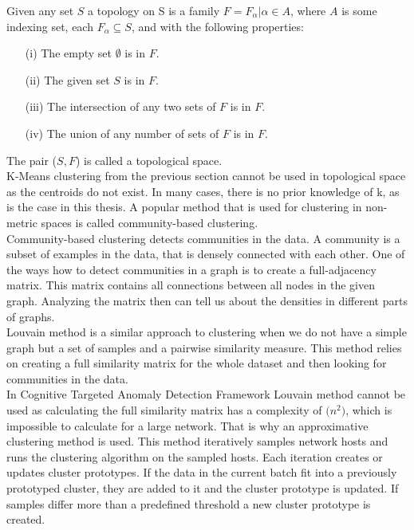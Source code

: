 \documentclass[thesis=B,english]{FITthesis}[2012/10/20]
\begin{document}
Given any set $S$ a topology on S is a family $F ={F_{\alpha} | \alpha \in A}$, where $A$ is some indexing set, each $F_{\alpha}  \subseteq S$, and with the following properties:
\begin{enumerate}                                                                 
    \item [(i)] The empty set $\emptyset$ is in $F$.                                                 
    \item [(ii)] The given set $S$ is in $F$.                                       
    \item [(iii)] The intersection of any two sets of $F$ is in $F$.
    \item [(iv)] The union of any number of sets of $F$ is in $F$.
\end{enumerate} 
The pair ($S, F$) is called a topological space. \\

K-Means clustering from the previous section cannot be used in topological space as the centroids do not exist.
In many cases, there is no prior knowledge of k, as is the case in this thesis.
A popular method that is used for clustering in non-metric spaces is called community-based clustering. \\

Community-based clustering detects communities in the data.
A community is a subset of examples in the data, that is densely connected with each other.
One of the ways how to detect communities in a graph is to create a full-adjacency matrix.
This matrix contains all connections between all nodes in the given graph.
Analyzing the matrix then can tell us about the densities in different parts of graphs.\\

Louvain method is a similar approach to clustering when we do not have a simple graph but a set of samples and a pairwise similarity measure.
This method relies on creating a full similarity matrix for the whole dataset and then looking for communities in the data. \\

In Cognitive Targeted Anomaly Detection Framework Louvain method cannot be used as calculating the full similarity matrix has a complexity of $\mathcal(n^2)$, which is impossible to calculate for a large network.
That is why an approximative clustering method is used.
This method iteratively samples network hosts and runs the clustering algorithm on the sampled hosts.
Each iteration creates or updates cluster prototypes.
If the data in the current batch fit into a previously prototyped cluster, they are added to it and the cluster prototype is updated.
If samples differ more than a predefined threshold a new cluster prototype is created.
\end{document}
